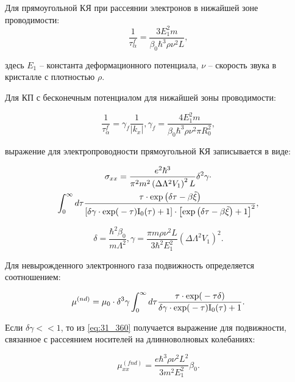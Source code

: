 Для прямоугольной КЯ при рассеянии электронов в нижайшей зоне проводимости:
\begin{equation} \label{eq:31_330}
\frac{1}{\tau _{\alpha }^{f} } =\frac{3E_{1}^{2} m}{\beta _{0} \hbar ^{3} \rho \nu ^{2} L},
\end{equation}

\noindent здесь $E_{1} $ -- константа деформационного потенциала, $\nu $ -- скорость звука в кристалле с плотностью $\rho $.

Для КП с бесконечным потенциалом для нижайшей зоны проводимости:

\begin{equation} \label{eq:31_340}
\frac{1}{\tau _{\alpha }^{f} } =\gamma _{f} \frac{1}{\left|k_{x} \right|} , \gamma _{f} =\frac{4E_{1}^{2} m}{\beta _{0} \hbar ^{3} \rho \nu ^{2} \pi R_{0}^{2} },
\end{equation}
 
\noindent выражение для электропроводности прямоугольной КЯ записывается в виде:

\begin{multline} \label{eq:31_350}
\sigma _{xx} =\frac{e^{2} \hbar ^{3} }{\pi ^{2} m^{2} \left(\Delta \Lambda ^{2} V_{1} \right)^{2} L} \delta ^{2} \gamma \cdot \\
 \int _{0}^{\infty }d\tau \frac{\tau \cdot {\exp}\left(\delta \tau -\beta \tilde{\xi }\right)}{\left[\delta \gamma \cdot {\exp(}-\tau ){\rm I}_{{\rm 0}} (\tau )+1\right]\cdot \left[{\exp}\left(\delta \tau -\beta \tilde{\xi }\right)+1\right]^{2} },
\end{multline}
  
\[
\delta =\frac{\hbar ^{2} \beta _{0} }{m\Lambda ^{2} } , \gamma =\frac{\pi m\rho \nu ^{2} L}{3\hbar ^{2} E_{1}^{2} } \left(\Delta \Lambda ^{2} V_{1} \right)^{2} .
\]
 
Для невырожденного электронного газа подвижность определяется соотношением:

\begin{equation} \label{eq:31_360}
\mu ^{(nd)} =\mu _{0} \cdot \delta ^{3} \gamma \int _{0}^{\infty }d\tau \frac{\tau \cdot {\rm exp(}-\tau \delta )}{\delta \gamma \cdot {\rm exp(}-\tau ){\rm I}_{{\rm 0}} (\tau )+1}. 
\end{equation}

Если $\delta \gamma <<1$, то из \eqref{eq:31_360} получается выражение для подвижности, связанное с рассеянием носителей на длинноволновых колебаниях:

\begin{equation} \label{eq:31_370}
\mu _{xx}^{(fnd)} =\frac{e\hbar ^{3} \rho \nu ^{2} L^{2} }{3m^{2} E_{1}^{2} } \beta _{0}. 
\end{equation}

